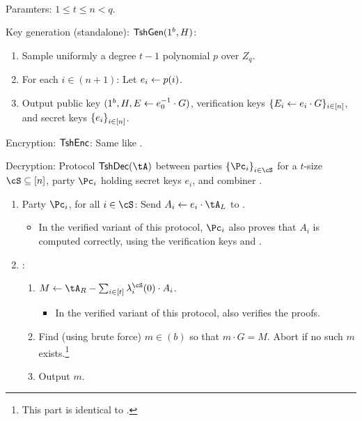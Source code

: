 \begin{algorithm}\label{alg:Tsh}~
	
	\item[Paramters:] $1\le t\le n <q$.
	
	
	\item[Key generation (standalone):] $\mathsf{TshGen}(1^b,H)$:
	\begin{enumerate}
		\item Sample   uniformly a degree $t-1$ polynomial  $p$ over $Z_q$. 
		
		\item For each $i\in (n+1)$: Let $e_i \leftarrow p(i)$.
		
		 
		
		 \item Output public key $(1^b,H,E \leftarrow e_0^{-1} \cdot G)$, verification keys $\{E_i \leftarrow e_i  \cdot G\}_{i\in [n]}$, and secret keys $\set{e_i}_{i\in [n]}$.
	\end{enumerate}
	

	
	\item[Encryption:]  $\mathsf{TshEnc}$:  Same like \EgEnc.
	
	
	
	\item[Decryption:] Protocol $\tdDec(\tA)$ between parties  $\set{\Pc_i}_{i\in \cS}$ for a $t$-size $\cS \subseteq [n]$, party $\Pc_i$ holding secret keys $e_i$, and combiner \Cc.
	
	\begin{enumerate}
		\item Party $\Pc_i$, for all $i\in \cS$:  Send   $A_i \asn e_i \cdot \tA_L$ to \Cc.
		
		\begin{itemize}
			\item In the verified variant of this protocol,  $\Pc_i$ also proves that  $A_i$ is  computed correctly, using  the verification keys and  \piZKPOK{\rEgConsSk}.
		\end{itemize}
		
		\item  \Cc: 
		\begin{enumerate}
			\item $M \asn \tA_R - \sum_{i\in [t]}   \lambda_i^\cS(0) \cdot A_i$.
			
			\begin{itemize}
				\item In the verified variant of this protocol, \Cc also verifies the proofs.
			\end{itemize}
			
			\item Find (using brute force) $m\in(b)$ so that $m\cdot G = M$. Abort if no such $m$ exists.\footnote{This part is identical to \EgDec.}
			
			\item Output $m$.
		\end{enumerate}
	\end{enumerate}
\end{algorithm}	

